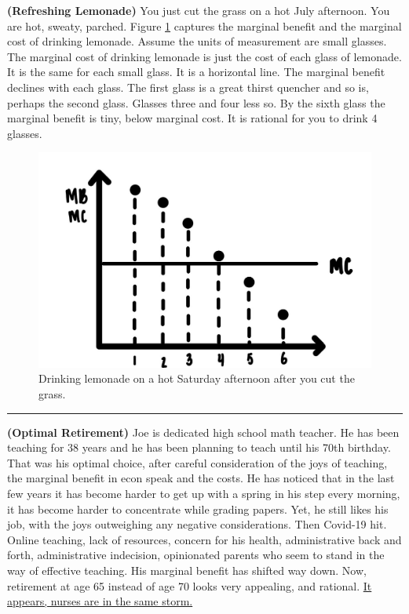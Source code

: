 \documentclass[
]{book}
\begin{document}
\textbf{(Refreshing Lemonade)} You just cut the grass on a hot July afternoon. You are hot, sweaty, parched. Figure \ref{fig:rationalchoice06} captures the marginal benefit and the marginal cost of drinking lemonade. Assume the units of measurement are small glasses. The marginal cost of drinking lemonade is just the cost of each glass of lemonade. It is the same for each small glass. It is a horizontal line. The marginal benefit declines with each glass. The first glass is a great thirst quencher and so is, perhaps the second glass. Glasses three and four less so. By the sixth glass the marginal benefit is tiny, below marginal cost. It is rational for you to drink 4 glasses.

\begin{figure}

{\centering \includegraphics[width=0.5\linewidth]{img/rationalchoice/fig6} 

}

\caption{Drinking lemonade on a hot Saturday afternoon after you cut the grass.}\label{fig:rationalchoice06}
\end{figure}

\begin{center}\rule{0.5\linewidth}{0.5pt}\end{center}

\textbf{(Optimal Retirement)} Joe is dedicated high school math teacher. He has been teaching for 38 years and he has been planning to teach until his 70th birthday. That was his optimal choice, after careful consideration of the joys of teaching, the marginal benefit in econ speak and the costs. He has noticed that in the last few years it has become harder to get up with a spring in his step every morning, it has become harder to concentrate while grading papers. Yet, he still likes his job, with the joys outweighing any negative considerations. Then Covid-19 hit. Online teaching, lack of resources, concern for his health, administrative back and forth, administrative indecision, opinionated parents who seem to stand in the way of effective teaching. His marginal benefit has shifted way down. Now, retirement at age 65 instead of age 70 looks very appealing, and rational. \href{https://www.npr.org/2020/11/18/936096303/nurses-are-under-pressure-as-hospitals-strain-to-meet-pandemic-demands}{It appears, nurses are in the same storm.}
\end{document}
